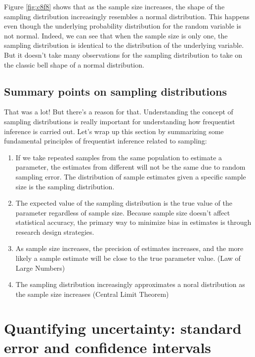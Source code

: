 \documentclass[
]{book}
\begin{document}
Figure \ref{fig:c8f8} shows that as the sample size increases, the shape of the sampling distribution increasingly resembles a normal distribution. This happens even though the underlying probability distribution for the random variable is not normal. Indeed, we can see that when the sample size is only one, the sampling distribution is identical to the distribution of the underlying variable. But it doesn't take many observations for the sampling distribution to take on the classic bell shape of a normal distribution.

\subsection{Summary points on sampling distributions}\label{summary-points-on-sampling-distributions}

That was a lot! But there's a reason for that. Understanding the concept of sampling distributions is really important for understanding how frequentist inference is carried out. Let's wrap up this section by summarizing some fundamental principles of frequentist inference related to sampling:

\begin{enumerate}
\def\labelenumi{\arabic{enumi}.}
\item
  If we take repeated samples from the same population to estimate a parameter, the estimates from different will not be the same due to random sampling error. The distribution of sample estimates given a specific sample size is the sampling distribution.
\item
  The expected value of the sampling distribution is the true value of the parameter regardless of sample size. Because sample size doesn't affect statistical accuracy, the primary way to minimize bias in estimates is through research design strategies.
\item
  As sample size increases, the precision of estimates increases, and the more likely a sample estimate will be close to the true parameter value. (Law of Large Numbers)
\item
  The sampling distribution increasingly approximates a noral distribution as the sample size increases (Central Limit Theorem)
\end{enumerate}

\section{Quantifying uncertainty: standard error and confidence intervals}\label{quantifying-uncertainty-standard-error-and-confidence-intervals}
\end{document}
